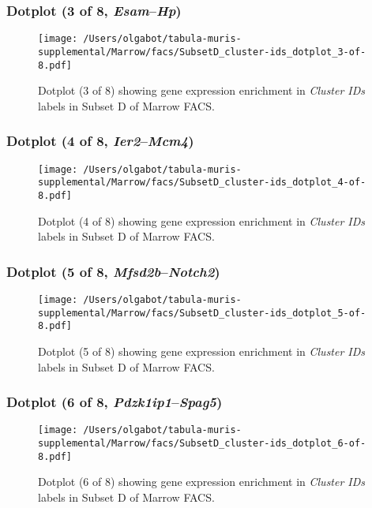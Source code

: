 \clearpage

\subsubsection{Dotplot (3 of 8, \emph{Esam}--\emph{Hp})}
\begin{figure}[h]
\centering
\texttt{[image: /Users/olgabot/tabula-muris-supplemental/Marrow/facs/SubsetD\_cluster-ids\_dotplot\_3-of-8.pdf]}

\caption{ Dotplot (3 of 8)  showing gene expression enrichment in \emph{Cluster IDs} labels in Subset D of Marrow FACS. }
\end{figure}


\clearpage

\subsubsection{Dotplot (4 of 8, \emph{Ier2}--\emph{Mcm4})}
\begin{figure}[h]
\centering
\texttt{[image: /Users/olgabot/tabula-muris-supplemental/Marrow/facs/SubsetD\_cluster-ids\_dotplot\_4-of-8.pdf]}

\caption{ Dotplot (4 of 8)  showing gene expression enrichment in \emph{Cluster IDs} labels in Subset D of Marrow FACS. }
\end{figure}


\clearpage

\subsubsection{Dotplot (5 of 8, \emph{Mfsd2b}--\emph{Notch2})}
\begin{figure}[h]
\centering
\texttt{[image: /Users/olgabot/tabula-muris-supplemental/Marrow/facs/SubsetD\_cluster-ids\_dotplot\_5-of-8.pdf]}

\caption{ Dotplot (5 of 8)  showing gene expression enrichment in \emph{Cluster IDs} labels in Subset D of Marrow FACS. }
\end{figure}


\clearpage

\subsubsection{Dotplot (6 of 8, \emph{Pdzk1ip1}--\emph{Spag5})}
\begin{figure}[h]
\centering
\texttt{[image: /Users/olgabot/tabula-muris-supplemental/Marrow/facs/SubsetD\_cluster-ids\_dotplot\_6-of-8.pdf]}

\caption{ Dotplot (6 of 8)  showing gene expression enrichment in \emph{Cluster IDs} labels in Subset D of Marrow FACS. }
\end{figure}



